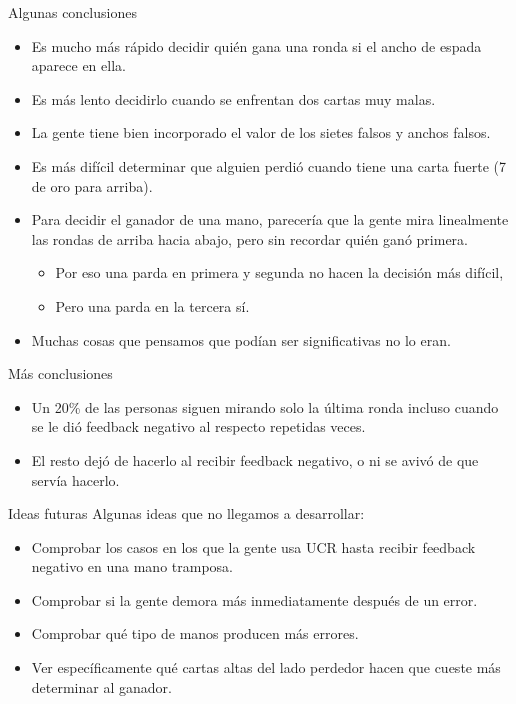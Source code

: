 \documentclass{beamer}
\begin{document}
\begin{frame}{Algunas conclusiones}
\begin{itemize}
\item Es mucho más rápido decidir quién gana una ronda si el ancho de espada aparece en ella.
\item Es más lento decidirlo cuando se enfrentan dos cartas muy malas.
\item La gente tiene bien incorporado el valor de los sietes falsos y anchos falsos.
\pause
\item Es más difícil determinar que alguien perdió cuando tiene una carta fuerte (7 de oro para arriba).
\item Para decidir el ganador de una mano, parecería que la gente mira linealmente las rondas de arriba hacia abajo, pero sin recordar quién ganó primera.
\begin{itemize}
	\item Por eso una parda en primera y segunda no hacen la decisión más difícil,
    \item Pero una parda en la tercera sí.
\end{itemize}
\pause
\item Muchas cosas que pensamos que podían ser significativas no lo eran.
\end{itemize}
\end{frame}

\begin{frame}{Más conclusiones}
\begin{itemize}
\item Un 20\% de las personas siguen mirando solo la última ronda incluso cuando se le dió feedback negativo al respecto repetidas veces.
\item El resto dejó de hacerlo al recibir feedback negativo, o ni se avivó de que servía hacerlo.
\end{itemize}
\end{frame}


\begin{frame}{Ideas futuras}
Algunas ideas que no llegamos a desarrollar:
\begin{itemize}
  \item Comprobar los casos en los que la gente usa UCR hasta recibir feedback negativo en una mano tramposa.
  \item Comprobar si la gente demora más inmediatamente después de un error.
  \item Comprobar qué tipo de manos producen más errores.
  \item Ver específicamente qué cartas altas del lado perdedor hacen que cueste más determinar al ganador.
\end{itemize}
\end{frame}
\end{document}
